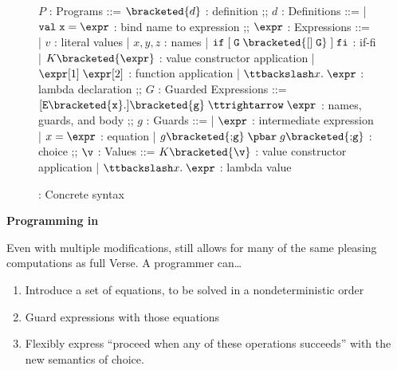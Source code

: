 \documentclass[manuscript,screen,review, 12pt, nonacm]{acmart}
\begin{document}
        \begin{figure}[H]
          \begin{center}
              \begin{bnf}
              $P$ : \textsf{Programs} ::=
              $\bracketed{d}$ : definition
              ;;
              $d$ : \textsf{Definitions} ::=
              | $\tt{val}\; x\; \tt{=}\; \expr$ : bind name to expression
              ;;
              $\expr$ : \textsf{Expressions} ::=
              | $v$ : literal values 
              | $x, y, z$ : names
              | $\tt{if}\; [\; G\; \bracketed{\tt{[]}\; G}\;]\; \tt{fi}$ : if-fi 
              | $K \bracketed{\expr}$ : value constructor application 
              | $\expr[1]\; \expr[2]$ : function application 
              | $\ttbackslash x\tt{.}\; \expr$ : lambda declaration 
              ;;
              $G$ : \textsf{Guarded Expressions} ::=  
              $[\tt{E }{\bracketed{x}}{\tt{.}}] \bracketed{g} \;\ttrightarrow\; \expr$ : names, guards, and body
              ;;
              $g$ : \textsf{Guards} ::=  
              | $\expr$ : intermediate expression 
              | $x \;\tt{=}\; \expr$ : equation 
              | $ g \bracketed{\tt{;} g} \; \pbar \; g \bracketed{\tt{;} g}$ : choice 
              ;;
              $\v$ : Values ::= $K\bracketed{\v}$ : value constructor application 
              | $\ttbackslash x\tt{.}\; \expr$ : lambda value
              \end{bnf}
          \end{center}
              \caption{\VMinus: Concrete syntax}
              \label{fig:vmsyntax}
              \end{figure}      

    \bf{Programming in \VMinus}


        
    Even with multiple modifications, \VMinus still allows for many of the same
    pleasing computations as full Verse. A programmer can\dots
        \begin{enumerate}
            \item Introduce a set of equations, to be solved in a
            nondeterministic order 
            \item Guard expressions with those equations 
            \item Flexibly express “proceed when any of these operations
            succeeds” with the new semantics of choice.  
        \end{enumerate}
\end{document}
